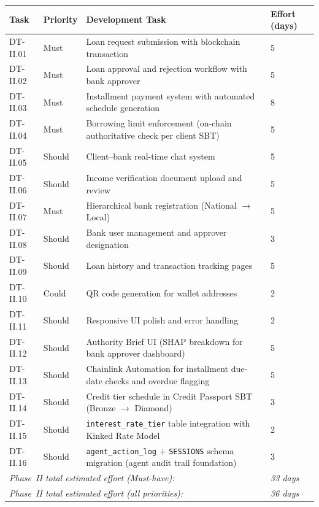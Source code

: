 \documentclass[12pt,a4paper]{report}
\newcommand{\tableheadcolor}{\rowcolor{TableHeadBg}}
\begin{document}
\begin{table}[H]
\centering
\begin{tabular}{p{1.8cm}p{1.8cm}p{7.5cm}p{1.5cm}}
\toprule
\tableheadcolor
\textbf{Task} & \textbf{Priority} & \textbf{Development Task} & \textbf{Effort (days)} \\
\midrule
DT-II.01 & Must & Loan request submission with blockchain transaction & 5 \\
DT-II.02 & Must & Loan approval and rejection workflow with bank approver & 5 \\
DT-II.03 & Must & Installment payment system with automated schedule generation & 8 \\
DT-II.04 & Must & Borrowing limit enforcement (on-chain authoritative check per client SBT) & 5 \\
DT-II.05 & Should & Client--bank real-time chat system & 5 \\
DT-II.06 & Should & Income verification document upload and review & 5 \\
DT-II.07 & Must & Hierarchical bank registration (National $\to$ Local) & 5 \\
DT-II.08 & Should & Bank user management and approver designation & 3 \\
DT-II.09 & Should & Loan history and transaction tracking pages & 5 \\
DT-II.10 & Could & QR code generation for wallet addresses & 2 \\
DT-II.11 & Should & Responsive UI polish and error handling & 2 \\
DT-II.12 & Should & Authority Brief UI (SHAP breakdown for bank approver dashboard) & 5 \\
DT-II.13 & Should & Chainlink Automation for installment due-date checks and overdue flagging & 5 \\
DT-II.14 & Should & Credit tier schedule in Credit Passport SBT (Bronze $\to$ Diamond) & 3 \\
DT-II.15 & Should & \texttt{interest\_rate\_tier} table integration with Kinked Rate Model & 2 \\
DT-II.16 & Should & \texttt{agent\_action\_log} + \texttt{SESSIONS} schema migration (agent audit trail foundation) & 3 \\
\multicolumn{3}{l}{\textit{Phase~II total estimated effort (Must-have):}} & \textit{33 days} \\
\multicolumn{3}{l}{\textit{Phase~II total estimated effort (all priorities):}} & \textit{36 days} \\
\bottomrule
\end{tabular}
\end{table}
\end{document}
